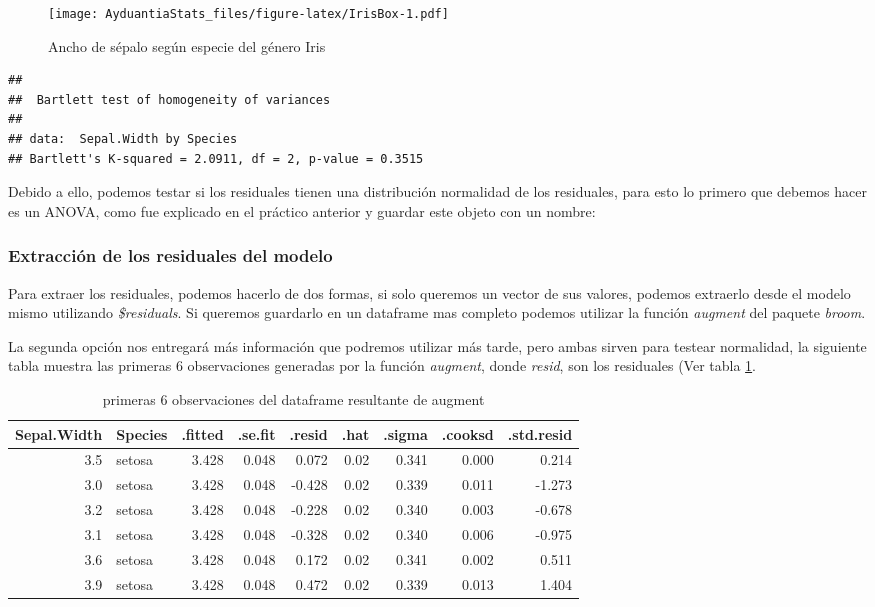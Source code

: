 \documentclass[]{book}
\begin{document}
\begin{figure}
\centering
\texttt{[image: AyduantiaStats\_files/figure-latex/IrisBox-1.pdf]}
\caption{\label{fig:IrisBox}Ancho de sépalo según especie del género Iris}
\end{figure}

\begin{verbatim}
## 
##  Bartlett test of homogeneity of variances
## 
## data:  Sepal.Width by Species
## Bartlett's K-squared = 2.0911, df = 2, p-value = 0.3515
\end{verbatim}

Debido a ello, podemos testar si los residuales tienen una distribución normalidad de los residuales, para esto lo primero que debemos hacer es un ANOVA, como fue explicado en el práctico anterior y guardar este objeto con un nombre:

\hypertarget{extraccion-de-los-residuales-del-modelo}{%
\subsubsection{Extracción de los residuales del modelo}\label{extraccion-de-los-residuales-del-modelo}}

Para extraer los residuales, podemos hacerlo de dos formas, si solo queremos un vector de sus valores, podemos extraerlo desde el modelo mismo utilizando \emph{\$residuals}. Si queremos guardarlo en un dataframe mas completo podemos utilizar la función \emph{augment} del paquete \emph{broom}.

La segunda opción nos entregará más información que podremos utilizar más tarde, pero ambas sirven para testear normalidad, la siguiente tabla muestra las primeras 6 observaciones generadas por la función \emph{augment}, donde \emph{resid}, son los residuales (Ver tabla \ref{tab:TabResid}.

\begin{table}

\caption{\label{tab:TabResid}primeras 6 observaciones del dataframe resultante de augment}
\centering
\begin{tabular}[t]{r|l|r|r|r|r|r|r|r}
\hline
Sepal.Width & Species & .fitted & .se.fit & .resid & .hat & .sigma & .cooksd & .std.resid\\
\hline
3.5 & setosa & 3.428 & 0.048 & 0.072 & 0.02 & 0.341 & 0.000 & 0.214\\
\hline
3.0 & setosa & 3.428 & 0.048 & -0.428 & 0.02 & 0.339 & 0.011 & -1.273\\
\hline
3.2 & setosa & 3.428 & 0.048 & -0.228 & 0.02 & 0.340 & 0.003 & -0.678\\
\hline
3.1 & setosa & 3.428 & 0.048 & -0.328 & 0.02 & 0.340 & 0.006 & -0.975\\
\hline
3.6 & setosa & 3.428 & 0.048 & 0.172 & 0.02 & 0.341 & 0.002 & 0.511\\
\hline
3.9 & setosa & 3.428 & 0.048 & 0.472 & 0.02 & 0.339 & 0.013 & 1.404\\
\hline
\end{tabular}
\end{table}
\end{document}
